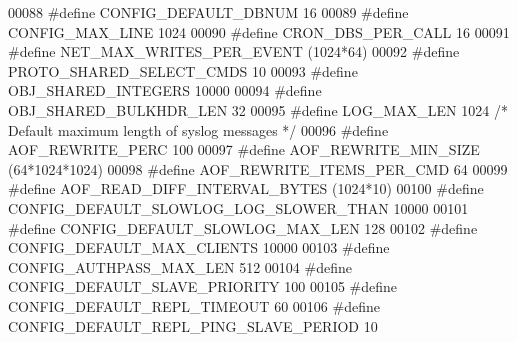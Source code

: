 \begin{DoxyCode}
00088 \textcolor{preprocessor}{#}\textcolor{preprocessor}{define} \textcolor{preprocessor}{CONFIG\_DEFAULT\_DBNUM}     16
00089 \textcolor{preprocessor}{#}\textcolor{preprocessor}{define} \textcolor{preprocessor}{CONFIG\_MAX\_LINE}    1024
00090 \textcolor{preprocessor}{#}\textcolor{preprocessor}{define} \textcolor{preprocessor}{CRON\_DBS\_PER\_CALL} 16
00091 \textcolor{preprocessor}{#}\textcolor{preprocessor}{define} \textcolor{preprocessor}{NET\_MAX\_WRITES\_PER\_EVENT} \textcolor{preprocessor}{(}1024\textcolor{preprocessor}{*}64\textcolor{preprocessor}{)}
00092 \textcolor{preprocessor}{#}\textcolor{preprocessor}{define} \textcolor{preprocessor}{PROTO\_SHARED\_SELECT\_CMDS} 10
00093 \textcolor{preprocessor}{#}\textcolor{preprocessor}{define} \textcolor{preprocessor}{OBJ\_SHARED\_INTEGERS} 10000
00094 \textcolor{preprocessor}{#}\textcolor{preprocessor}{define} \textcolor{preprocessor}{OBJ\_SHARED\_BULKHDR\_LEN} 32
00095 \textcolor{preprocessor}{#}\textcolor{preprocessor}{define} \textcolor{preprocessor}{LOG\_MAX\_LEN}    1024 \textcolor{comment}{/* Default maximum length of syslog messages */}
00096 \textcolor{preprocessor}{#}\textcolor{preprocessor}{define} \textcolor{preprocessor}{AOF\_REWRITE\_PERC}  100
00097 \textcolor{preprocessor}{#}\textcolor{preprocessor}{define} \textcolor{preprocessor}{AOF\_REWRITE\_MIN\_SIZE} \textcolor{preprocessor}{(}64\textcolor{preprocessor}{*}1024\textcolor{preprocessor}{*}1024\textcolor{preprocessor}{)}
00098 \textcolor{preprocessor}{#}\textcolor{preprocessor}{define} \textcolor{preprocessor}{AOF\_REWRITE\_ITEMS\_PER\_CMD} 64
00099 \textcolor{preprocessor}{#}\textcolor{preprocessor}{define} \textcolor{preprocessor}{AOF\_READ\_DIFF\_INTERVAL\_BYTES} \textcolor{preprocessor}{(}1024\textcolor{preprocessor}{*}10\textcolor{preprocessor}{)}
00100 \textcolor{preprocessor}{#}\textcolor{preprocessor}{define} \textcolor{preprocessor}{CONFIG\_DEFAULT\_SLOWLOG\_LOG\_SLOWER\_THAN} 10000
00101 \textcolor{preprocessor}{#}\textcolor{preprocessor}{define} \textcolor{preprocessor}{CONFIG\_DEFAULT\_SLOWLOG\_MAX\_LEN} 128
00102 \textcolor{preprocessor}{#}\textcolor{preprocessor}{define} \textcolor{preprocessor}{CONFIG\_DEFAULT\_MAX\_CLIENTS} 10000
00103 \textcolor{preprocessor}{#}\textcolor{preprocessor}{define} \textcolor{preprocessor}{CONFIG\_AUTHPASS\_MAX\_LEN} 512
00104 \textcolor{preprocessor}{#}\textcolor{preprocessor}{define} \textcolor{preprocessor}{CONFIG\_DEFAULT\_SLAVE\_PRIORITY} 100
00105 \textcolor{preprocessor}{#}\textcolor{preprocessor}{define} \textcolor{preprocessor}{CONFIG\_DEFAULT\_REPL\_TIMEOUT} 60
00106 \textcolor{preprocessor}{#}\textcolor{preprocessor}{define} \textcolor{preprocessor}{CONFIG\_DEFAULT\_REPL\_PING\_SLAVE\_PERIOD} 10

\end{DoxyCode}
